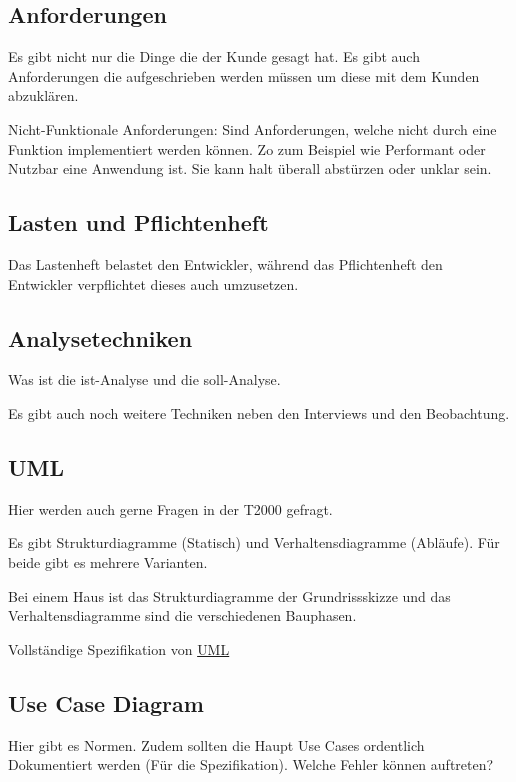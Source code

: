 \documentclass[a4paper]{article}
\begin{document}
\subsection{Anforderungen}

Es gibt nicht nur die Dinge die der Kunde gesagt hat. Es gibt auch Anforderungen die aufgeschrieben werden müssen um diese mit dem Kunden abzuklären.

Nicht-Funktionale Anforderungen: Sind Anforderungen, welche nicht durch eine Funktion implementiert werden können. Zo zum Beispiel wie Performant oder Nutzbar eine Anwendung ist. Sie kann halt überall abstürzen oder unklar sein.

\subsection{Lasten und Pflichtenheft}

Das Lastenheft belastet den Entwickler, während das Pflichtenheft den Entwickler verpflichtet dieses auch umzusetzen.

\subsection{Analysetechniken}

Was ist die ist-Analyse und die soll-Analyse.

Es gibt auch noch weitere Techniken neben den Interviews und den Beobachtung.

\subsection{UML}

Hier werden auch gerne Fragen in der T2000 gefragt.

Es gibt Strukturdiagramme (Statisch) und Verhaltensdiagramme (Abläufe). Für beide gibt es mehrere Varianten.

Bei einem Haus ist das Strukturdiagramme der Grundrissskizze und das Verhaltensdiagramme sind die verschiedenen Bauphasen.

Vollständige Spezifikation von \href{https://www.omg.org/spec/UML}{UML}

\subsection{Use Case Diagram}

Hier gibt es Normen. Zudem sollten die Haupt Use Cases ordentlich Dokumentiert werden (Für die Spezifikation). Welche Fehler können auftreten?
\end{document}
